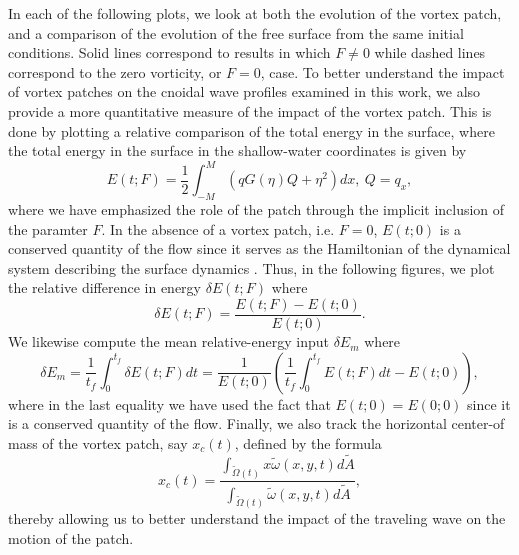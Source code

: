 \documentclass[a4paper,11pt]{article}
\begin{document}
In each of the following plots, we look at both the evolution of the vortex patch, and a comparison of the evolution of the free surface from the same initial conditions.  Solid lines correspond to results in which $F\neq0$ while dashed lines correspond to the zero vorticity, or $F=0$, case.  To better understand the impact of vortex patches on the cnoidal wave profiles examined in this work, we also provide a more quantitative measure of the impact of the vortex patch.  This is done by plotting a relative comparison of the total energy in the surface, where the total energy in the surface in the shallow-water coordinates is given by 
\[
E(t;F) = \frac{1}{2}\int_{-M}^{M} \left(q G(\eta)Q  + \eta^{2}\right)dx, ~ Q = q_{x},
\]
where we have emphasized the role of the patch through the implicit inclusion of the paramter $F$.  In the absence of a vortex patch, i.e. $F=0$, $E(t;0)$ is a conserved quantity of the flow since it serves as the Hamiltonian of the dynamical system describing the surface dynamics \cite{zakharov}.  Thus, in the following figures, we plot the relative difference in energy $\delta E(t;F)$ where
\[
\delta E(t;F) = \frac{E(t;F)-E(t;0)}{E(t;0)}.
\]
We likewise compute the mean relative-energy input $\delta E_{m}$ where
\[
\delta E_{m} = \frac{1}{t_{f}}\int_{0}^{t_{f}} \delta E(t;F) dt = \frac{1}{E(t;0)}\left(\frac{1}{t_{f}}\int_{0}^{t_{f}}E(t;F)dt - E(t;0) \right),
\]
where in the last equality we have used the fact that $E(t;0) = E(0;0)$ since it is a conserved quantity of the flow.  Finally, we also track the horizontal center-of mass of the vortex patch, say $x_{c}(t)$, defined by the formula
\[
x_{c}(t) = \frac{\int_{\tilde{\Omega}(t)} x\tilde{\omega}(x,y,t) d\tilde{A}}{\int_{\tilde{\Omega}(t)} \tilde{\omega}(x,y,t) d\tilde{A}},
\]
thereby allowing us to better understand the impact of the traveling wave on the motion of the patch.  
\end{document}
